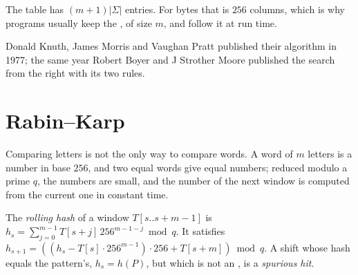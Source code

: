 \begin{omfigure}
\par{}
\end{omfigure}

The table has $(m + 1)|\Sigma|$ entries. For bytes that is $256$ columns, which is why programs usually keep the , of size $m$, and follow it at run time.

\begin{history}
Donald Knuth, James Morris and Vaughan Pratt published their algorithm in 1977; the same year Robert Boyer and J
Strother Moore published the search from the right with its two rules.
\end{history}

\section{Rabin--Karp}\label{sec:b2:text-algorithms:rabin-karp}

Comparing letters is not the only way to compare words. A word of $m$ letters is a number in base $256$, and two equal
words give equal numbers; reduced modulo a prime $q$, the numbers are small, and the number of the next window is
computed from the current one in constant time.

\begin{definition}\label{def:b2:text-algorithms:rolling}
The \emph{rolling hash} of a window $T[s..s+m-1]$ is $h_s = \sum_{j=0}^{m-1} T[s + j]\, 256^{m-1-j}
\bmod q$. It satisfies $h_{s+1} = ((h_s - T[s] \cdot 256^{m-1}) \cdot 256 + T[s + m]) \bmod q$. A shift whose hash equals
the pattern's, $h_s = h(P)$, but which is not an , is a \emph{spurious hit}.
\end{definition}

